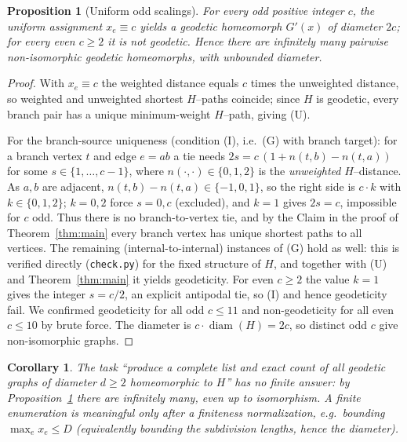 \documentclass{amsart}
\newtheorem{proposition}{Proposition}
\newtheorem{corollary}{Corollary}
\theoremstyle{definition}
\begin{document}
\begin{proposition}[Uniform odd scalings]\label{prop:infinite}
For every odd positive integer $c$, the uniform assignment $x_e\equiv c$ yields a
geodetic homeomorph $G'(x)$ of diameter $2c$; for every even $c\ge2$ it is not
geodetic. Hence there are infinitely many pairwise non-isomorphic geodetic
homeomorphs, with unbounded diameter.
\end{proposition}

\begin{proof}
With $x_e\equiv c$ the weighted distance equals $c$ times the unweighted
distance, so weighted and unweighted shortest $H$--paths coincide; since $H$ is
geodetic, every branch pair has a unique minimum-weight $H$--path, giving (U).

For the branch-source uniqueness (condition (I), i.e.\ (G) with branch target):
for a branch vertex $t$ and edge $e=ab$ a tie needs $2s=c\,(1+n(t,b)-n(t,a))$ for
some $s\in\{1,\dots,c-1\}$, where $n(\cdot,\cdot)\in\{0,1,2\}$ is the
\emph{unweighted} $H$--distance. As $a,b$ are adjacent, $n(t,b)-n(t,a)\in
\{-1,0,1\}$, so the right side is $c\cdot k$ with $k\in\{0,1,2\}$; $k=0,2$ force
$s=0,c$ (excluded), and $k=1$ gives $2s=c$, impossible for $c$ odd. Thus there is
no branch-to-vertex tie, and by the Claim in the proof of
Theorem~\ref{thm:main} every branch vertex has unique shortest paths to all
vertices. The remaining (internal-to-internal) instances of (G) hold as well:
this is verified directly (\texttt{check.py}) for the fixed structure of $H$, and
together with (U) and Theorem~\ref{thm:main} it yields geodeticity. For even
$c\ge2$ the value $k=1$ gives the integer $s=c/2$, an explicit antipodal tie, so
(I) and hence geodeticity fail. We confirmed geodeticity for all odd $c\le11$ and
non-geodeticity for all even $c\le10$ by brute force. The diameter is
$c\cdot\operatorname{diam}(H)=2c$, so distinct odd $c$ give non-isomorphic
graphs.
\end{proof}

\begin{corollary}\label{cor:illposed}
The task ``produce a complete list and exact \emph{count} of all geodetic graphs
of diameter $d\ge2$ homeomorphic to $H$'' has no finite answer: by
Proposition~\ref{prop:infinite} there are infinitely many, even up to
isomorphism. A finite enumeration is meaningful only after a finiteness
normalization, e.g.\ bounding $\max_e x_e\le D$ (equivalently bounding the
subdivision lengths, hence the diameter).
\end{corollary}
\end{document}
